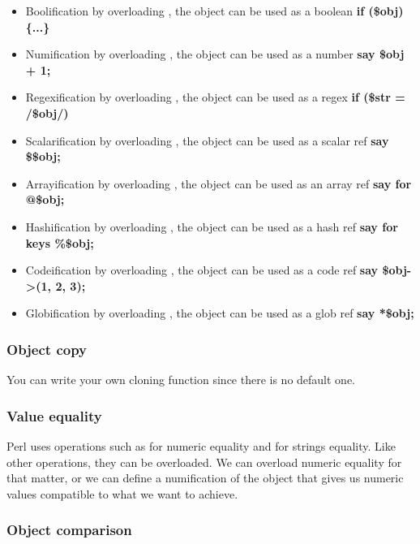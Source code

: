 \documentclass{KodeBook}
\begin{document}
\begin{itemize}
	\item Boolification by overloading , the object can be used as a boolean \textbf{if (\$obj) \{...\}}
	\item Numification by overloading , the object can be used as a number \textbf{say \$obj + 1;}
	\item Regexification by overloading , the object can be used as a regex \textbf{if (\$str =~ /\$obj/)}
	\item Scalarification by overloading \keyword{\$\{\}}, the object can be used as a scalar ref \textbf{say \$\$obj;}
	\item Arrayification by overloading , the object can be used as an array ref \textbf{say for @\$obj;}
	\item Hashification by overloading \keyword{\%\{\}}, the object can be used as a hash ref \textbf{say for keys \%\$obj;}
	\item Codeification by overloading \keyword{\&\{\}}, the object can be used as a code ref \textbf{say \$obj->(1, 2, 3);}
	\item Globification by overloading \keyword{*\{\}}, the object can be used as a glob ref \textbf{say *\$obj;}
\end{itemize}

\subsubsection{Object copy}

You can write your own cloning function since there is no default one.

\subsubsection{Value equality}

Perl uses operations such as \keyword{==} for numeric equality and  for strings equality. 
Like other operations, they can be overloaded.
We can overload numeric equality for that matter, or we can define a numification of the object that gives us numeric values compatible to what we want to achieve.



\subsubsection{Object comparison}
\end{document}
